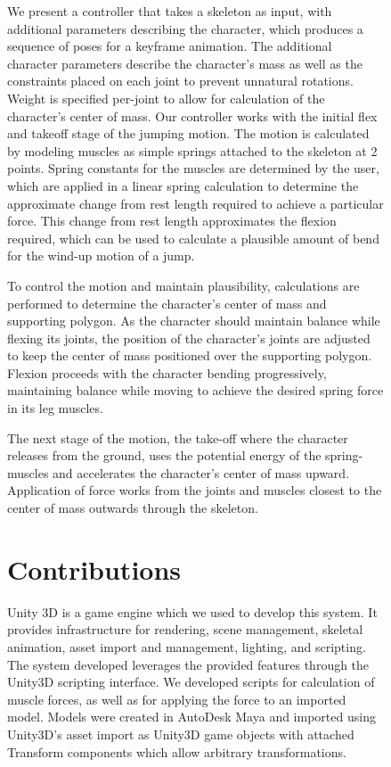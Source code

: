 \begin{figure}[htp]
{We present a controller that takes a skeleton as input, with additional parameters describing the character, which produces a sequence of poses for a keyframe animation.  The additional character parameters describe the character's mass as well as the constraints placed on each joint to prevent unnatural rotations.  Weight is specified per-joint to allow for calculation of the character's center of mass.  Our controller works with the initial flex and takeoff stage of the jumping motion.  The motion is calculated by modeling muscles as simple springs attached to the skeleton at 2 points.  Spring constants for the muscles are determined by the user, which are applied in a linear spring calculation to determine the approximate change from rest length required to achieve a particular force.  This change from rest length approximates the flexion required, which can be used to calculate a plausible amount of bend for the wind-up motion of a jump.

To control the motion and maintain plausibility, calculations are performed to determine the character's center of mass and supporting polygon.  As the character should maintain balance while flexing its joints, the position of the character's joints are adjusted to keep the center of mass positioned over the supporting polygon.  Flexion proceeds with the character bending progressively, maintaining balance while moving to achieve the desired spring force in its leg muscles.

The next stage of the motion, the take-off where the character releases from the ground, uses the potential energy of the spring-muscles and accelerates the character's center of mass upward.  Application of force works from the joints and muscles closest to the center of mass outwards through the skeleton.


\section{Contributions}
	Unity 3D is a game engine which we used to develop this system.  It provides infrastructure for rendering, scene management, skeletal animation, asset import and management, lighting, and scripting.  The system developed leverages the provided features through the Unity3D scripting interface.  We developed scripts for calculation of muscle forces, as well as for applying the force to an imported model.  Models were created in AutoDesk Maya and imported using Unity3D's asset import as Unity3D game objects with attached Transform components which allow arbitrary transformations.

}
\end{figure}
